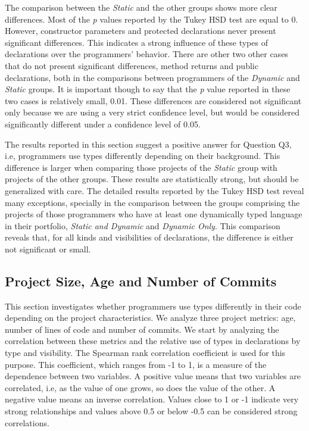 \documentclass[]{sigplanconf}
\begin{document}
The comparison between the \emph{Static} and the other groups shows more clear differences.
Most of the \emph{p} values reported by the Tukey HSD test are equal to 0.
However, constructor parameters and protected declarations never present significant differences.
This indicates a strong influence of these types of declarations over the programmers' behavior.
There are other two other cases that do not present significant differences, method returns and public declarations, both in the comparisons between programmers of the \emph{Dynamic} and \emph{Static} groups.
It is important though to say that the \emph{p} value reported in these two cases is relatively small, 0.01.
These differences are considered not significant only because we are using a very strict confidence level, but would be considered significantly different under a confidence level of 0.05.

The results reported in this section suggest a positive answer for Question Q3, i.e, programmers use types differently depending on their background.
This difference is larger when comparing those projects of the \emph{Static} group with projects of the other groups.
These results are statistically strong,  but should be generalized with care.
The detailed results reported by the Tukey HSD test reveal many exceptions, specially in the comparison between the groups comprising the projects of those programmers who have at least one dynamically typed language in their portfolio, \emph{Static and Dynamic} and \emph{Dynamic Only}.
This comparison reveals that, for all kinds and visibilities of declarations, the difference is either not significant or small.


\subsection{Project Size, Age and Number of Commits\label{sec:results-maturity}}
This section investigates whether programmers use types differently in their code depending on the project characteristics.
We analyze three project metrics: age, number of lines of code and number of commits.
We start by analyzing the correlation between these metrics and the relative use of types in declarations by type and visibility.
The Spearman rank correlation coefficient is used for this purpose.
This coefficient, which ranges from -1 to 1, is a measure of the dependence between two variables.
A positive value means that two variables are correlated, i.e, as the value of one grows, so does the value of the other.
A negative value means an inverse correlation.
Values close to 1 or -1 indicate very strong relationships and values above 0.5 or below -0.5 can be considered strong correlations.
\end{document}
